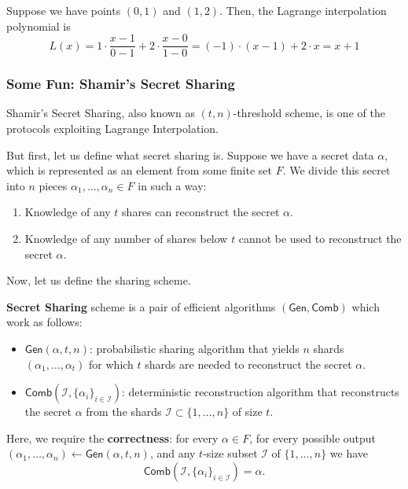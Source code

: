 \documentclass[../lecture-notes.tex]{subfiles}
\begin{document}
\begin{example}
    Suppose we have points $(0,1)$ and $(1,2)$. Then, the Lagrange interpolation polynomial is
    \begin{equation}
        L(x) = 1 \cdot \frac{x-1}{0-1} + 2 \cdot \frac{x-0}{1-0} = (-1) \cdot (x-1) + 2 \cdot x = x + 1
    \end{equation}
\end{example}

\subsubsection{Some Fun: Shamir's Secret Sharing}

Shamir's Secret Sharing, also known as $(t,n)$-threshold scheme, is one of the protocols exploiting Lagrange Interpolation. 

But first, let us define what secret sharing is. Suppose we have a secret data $\alpha$, which is represented as an element from some finite set $F$. We divide this secret into $n$ pieces $\alpha_1,\dots,\alpha_n \in F$ in such a way:
\begin{enumerate}
    \item Knowledge of any $t$ shares can reconstruct the secret $\alpha$.
    \item Knowledge of any number of shares below $t$ cannot be used to reconstruct the secret $\alpha$.
\end{enumerate}

Now, let us define the sharing scheme.

\begin{definition}
    \textbf{Secret Sharing} scheme is a pair of efficient algorithms $(\mathsf{Gen}, \mathsf{Comb})$ which work as follows:
    \begin{itemize}
        \item $\mathsf{Gen}(\alpha, t, n)$: probabilistic sharing algorithm that yields $n$ shards $(\alpha_1,\dots,\alpha_t)$ for which $t$ shards are needed to reconstruct the secret $\alpha$.
        \item $\mathsf{Comb}(\mathcal{I}, \{\alpha_i\}_{i \in \mathcal{I}})$: deterministic reconstruction algorithm that reconstructs the secret $\alpha$ from the shards $\mathcal{I} \subset \{1,\dots,n\}$ of size $t$.
    \end{itemize}

    Here, we require the \textbf{correctness}: for every $\alpha \in F$, for every possible output $(\alpha_1,\dots,\alpha_n) \gets \mathsf{Gen}(\alpha, t, n)$, and any $t$-size subset $\mathcal{I}$ of $\{1,\dots,n\}$ we have
    \begin{equation}
        \mathsf{Comb}(\mathcal{I}, \{\alpha_i\}_{i \in \mathcal{I}}) = \alpha.
    \end{equation}
\end{definition}
\end{document}

